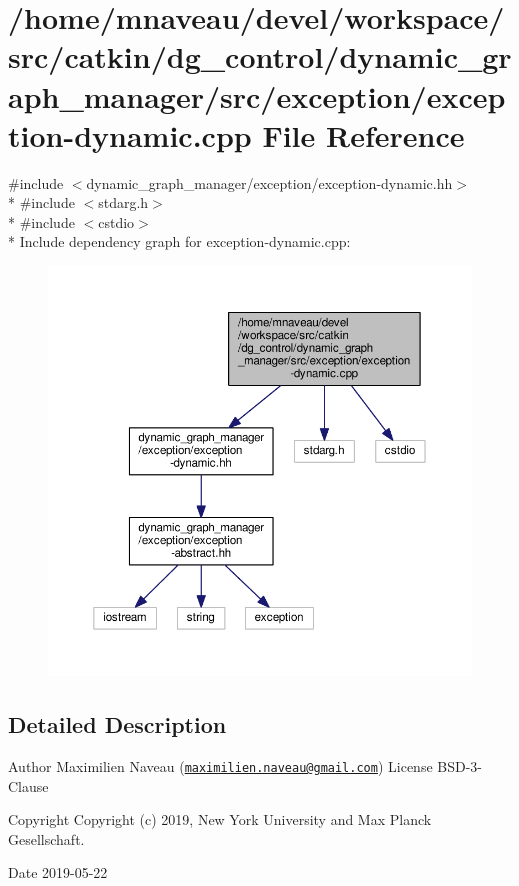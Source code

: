 \hypertarget{exception-dynamic_8cpp}{}\section{/home/mnaveau/devel/workspace/src/catkin/dg\+\_\+control/dynamic\+\_\+graph\+\_\+manager/src/exception/exception-\/dynamic.cpp File Reference}
\label{exception-dynamic_8cpp}
{\ttfamily \#include $<$dynamic\+\_\+graph\+\_\+manager/exception/exception-\/dynamic.\+hh$>$}\\*
{\ttfamily \#include $<$stdarg.\+h$>$}\\*
{\ttfamily \#include $<$cstdio$>$}\\*
Include dependency graph for exception-\/dynamic.cpp\+:\nopagebreak
\begin{figure}[H]
\begin{center}
\leavevmode
\includegraphics[width=350pt]{exception-dynamic_8cpp__incl}
\end{center}
\end{figure}


\subsection{Detailed Description}
\begin{DoxyAuthor}{Author}
Maximilien Naveau (\href{mailto:maximilien.naveau@gmail.com}{\tt maximilien.\+naveau@gmail.\+com})  License B\+S\+D-\/3-\/\+Clause 
\end{DoxyAuthor}
\begin{DoxyCopyright}{Copyright}
Copyright (c) 2019, New York University and Max Planck Gesellschaft. 
\end{DoxyCopyright}
\begin{DoxyDate}{Date}
2019-\/05-\/22 
\end{DoxyDate}

